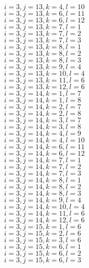 \documentclass[14pt]{article}
\begin{document}
    $i=3,j=13,k=4,l=10 $ \\ 
    $i=3,j=13,k=6,l=11 $ \\ 
    $i=3,j=13,k=6,l=12 $ \\ 
    $i=3,j=13,k=7,l=1 $ \\ 
    $i=3,j=13,k=7,l=2 $ \\ 
    $i=3,j=13,k=7,l=3 $ \\ 
    $i=3,j=13,k=8,l=1 $ \\ 
    $i=3,j=13,k=8,l=2 $ \\ 
    $i=3,j=13,k=8,l=3 $ \\ 
    $i=3,j=13,k=9,l=4 $ \\ 
    $i=3,j=13,k=10,l=4 $ \\ 
    $i=3,j=13,k=11,l=6 $ \\ 
    $i=3,j=13,k=12,l=6 $ \\ 
    $i=3,j=14,k=1,l=7 $ \\ 
    $i=3,j=14,k=1,l=8 $ \\ 
    $i=3,j=14,k=2,l=7 $ \\ 
    $i=3,j=14,k=2,l=8 $ \\ 
    $i=3,j=14,k=3,l=7 $ \\ 
    $i=3,j=14,k=3,l=8 $ \\ 
    $i=3,j=14,k=4,l=9 $ \\ 
    $i=3,j=14,k=4,l=10 $ \\ 
    $i=3,j=14,k=6,l=11 $ \\ 
    $i=3,j=14,k=6,l=12 $ \\ 
    $i=3,j=14,k=7,l=1 $ \\ 
    $i=3,j=14,k=7,l=2 $ \\ 
    $i=3,j=14,k=7,l=3 $ \\ 
    $i=3,j=14,k=8,l=1 $ \\ 
    $i=3,j=14,k=8,l=2 $ \\ 
    $i=3,j=14,k=8,l=3 $ \\ 
    $i=3,j=14,k=9,l=4 $ \\ 
    $i=3,j=14,k=10,l=4 $ \\ 
    $i=3,j=14,k=11,l=6 $ \\ 
    $i=3,j=14,k=12,l=6 $ \\ 
    $i=3,j=15,k=1,l=6 $ \\ 
    $i=3,j=15,k=2,l=6 $ \\ 
    $i=3,j=15,k=3,l=6 $ \\ 
    $i=3,j=15,k=6,l=1 $ \\ 
    $i=3,j=15,k=6,l=2 $ \\ 
    $i=3,j=15,k=6,l=3 $ \\ 
\end{document}
